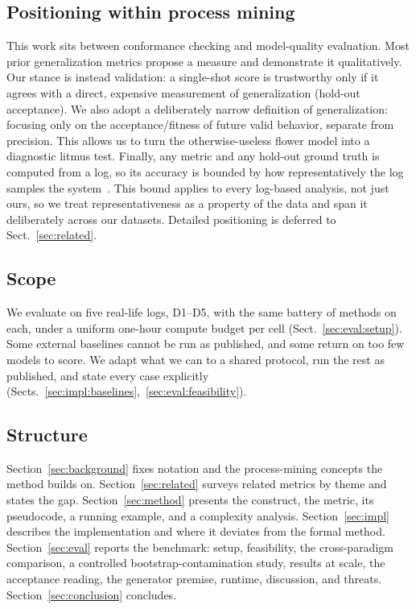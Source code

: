 \documentclass[runningheads]{llncs}
\newcommand{\chg}[1]{\textcolor{chgblue}{#1}}
\begin{document}
\subsection{Positioning within process mining}
This work sits between conformance checking and model-quality evaluation. Most prior generalization metrics propose a measure and demonstrate it qualitatively. Our stance is instead validation: a single-shot score is trustworthy only if it agrees with a direct, expensive measurement of generalization (hold-out acceptance). We also adopt a deliberately narrow definition of generalization: focusing only on the acceptance/fitness of future valid behavior, separate from precision. This allows us to turn the otherwise-useless flower model into a diagnostic litmus test. Finally, any metric and any hold-out ground truth is computed from a log, so its accuracy is bounded by how representatively the log samples the system~\cite{karunaratne2024representativeness}. This bound applies to every log-based analysis, not just ours, so we treat representativeness as a property of the data and span it deliberately across our datasets. Detailed positioning is deferred to Sect.~\ref{sec:related}.

\subsection{Scope}
\label{sec:scope}
\chg{We evaluate on five real-life logs, D1--D5, with the same battery of methods on each, under a uniform one-hour compute budget per cell (Sect.~\ref{sec:eval:setup}).} Some external baselines cannot be run as published, and some return on too few models to score. We adapt what we can to a shared protocol, run the rest as published, and state every case explicitly (Sects.~\ref{sec:impl:baselines},~\ref{sec:eval:feasibility}).

\subsection{Structure}
Section~\ref{sec:background} fixes notation and the process-mining concepts the method builds on. Section~\ref{sec:related} surveys related metrics by theme and states the gap. Section~\ref{sec:method} presents the construct, the metric, its pseudocode, a running example, and a complexity analysis. Section~\ref{sec:impl} describes the implementation and where it deviates from the formal method. Section~\ref{sec:eval} reports the benchmark: setup, feasibility, \chg{the cross-paradigm comparison, a controlled bootstrap-contamination study, results at scale, the acceptance reading, the generator premise, runtime, discussion, and threats}. Section~\ref{sec:conclusion} concludes.
\end{document}
